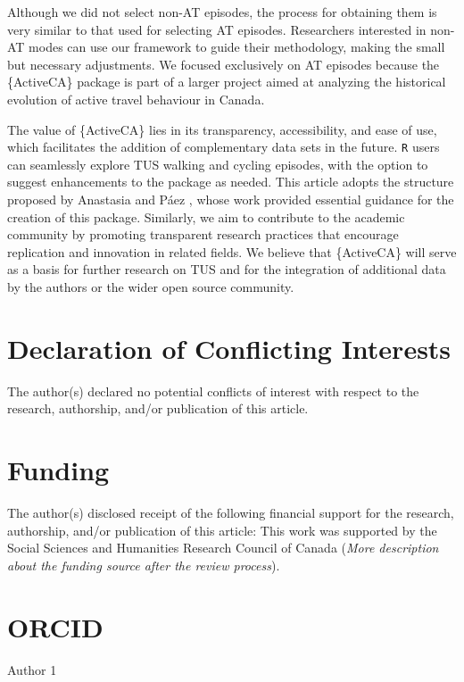 \documentclass[Royal,times,sageh]{sagej}
\begin{document}
Although we did not select non-AT episodes, the process for obtaining
them is very similar to that used for selecting AT episodes. Researchers
interested in non-AT modes can use our framework to guide their
methodology, making the small but necessary adjustments. We focused
exclusively on AT episodes because the \{ActiveCA\} package is part of a
larger project aimed at analyzing the historical evolution of active
travel behaviour in Canada.

The value of \{ActiveCA\} lies in its transparency, accessibility, and
ease of use, which facilitates the addition of complementary data sets
in the future. \texttt{R} users can seamlessly explore TUS walking and
cycling episodes, with the option to suggest enhancements to the package
as needed. This article adopts the structure proposed by Anastasia and
Páez \citeyearpar{soukhov2023}, whose work provided essential guidance
for the creation of this package. Similarly, we aim to contribute to the
academic community by promoting transparent research practices that
encourage replication and innovation in related fields. We believe that
\{ActiveCA\} will serve as a basis for further research on TUS and for
the integration of additional data by the authors or the wider open
source community.

\section{Declaration of Conflicting
Interests}\label{declaration-of-conflicting-interests}

The author(s) declared no potential conflicts of interest with respect
to the research, authorship, and/or publication of this article.

\section{Funding}\label{funding}

The author(s) disclosed receipt of the following financial support for
the research, authorship, and/or publication of this article: This work
was supported by the Social Sciences and Humanities Research Council of
Canada (\emph{More description about the funding source after the review
process}).

\section{ORCID}\label{orcid}

Author 1
\end{document}
